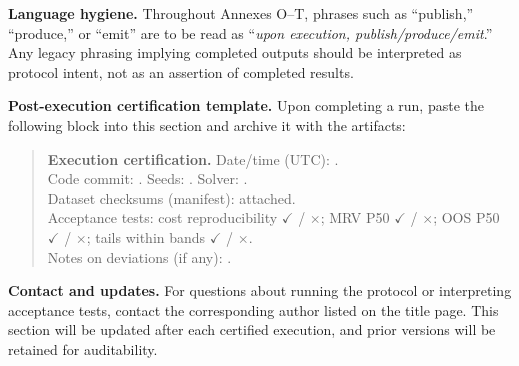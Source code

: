 \documentclass[11pt]{article}
\numberwithin{equation}{section}
\theoremstyle{definition}
\theoremstyle{remark}
\begin{document}
\medskip
\noindent\textbf{Language hygiene.}
Throughout Annexes O–T, phrases such as “publish,” “produce,” or “emit” are to be read as
“\emph{upon execution, publish/produce/emit}.” Any legacy phrasing implying completed
outputs should be interpreted as protocol intent, not as an assertion of completed results.

\medskip
\noindent\textbf{Post-execution certification template.}
Upon completing a run, paste the following block into this section and archive it with the artifacts:
\begin{quote}\small
\textbf{Execution certification.} Date/time (UTC): \underline{\hspace{3cm}}.\\
Code commit: \underline{\hspace{5cm}}.  Seeds: \underline{\hspace{3cm}}.  Solver: \underline{\hspace{4cm}}.\\
Dataset checksums (manifest): attached.\\
Acceptance tests: cost reproducibility $\checkmark$ / $\times$; MRV P50 $\checkmark$ / $\times$; OOS P50 $\checkmark$ / $\times$; tails within bands $\checkmark$ / $\times$.\\
Notes on deviations (if any): \underline{\hspace{8cm}}.
\end{quote}

\medskip
\noindent\textbf{Contact and updates.}
For questions about running the protocol or interpreting acceptance tests, contact the corresponding author listed on the title page. This section will be updated after each certified execution, and prior versions will be retained for auditability.

\newpage
\end{document}
